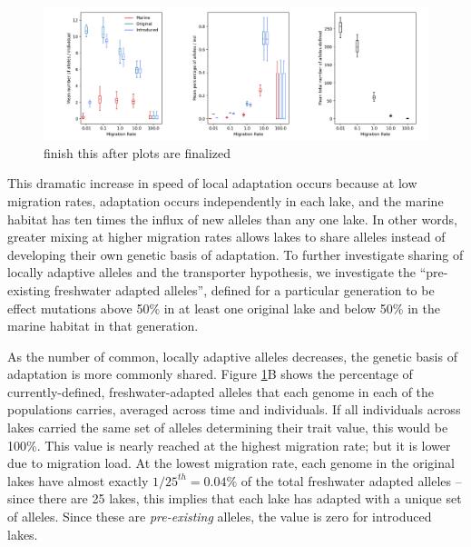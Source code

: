 \documentclass{article}
\begin{document}

\begin{figure}
	\begin{center}
  		\includegraphics[width=\linewidth]{semi_final_plots/FAA_semi_final.png}
  		\caption{
			finish this after plots are finalized
		}
		\label{fig:MPFAI}
	\end{center}
\end{figure}

This dramatic increase in speed of local adaptation occurs because
at low migration rates, adaptation occurs independently in each lake,
and the marine habitat has ten times the influx of new alleles than any one lake.
In other words, 
greater mixing at higher migration rates allows lakes to share alleles
instead of developing their own genetic basis of adaptation.
To further investigate sharing of locally adaptive alleles and the transporter hypothesis,
we investigate the ``pre-existing freshwater adapted alleles'', defined for a particular generation
to be effect mutations above 50\% in at least one original lake and below 50\% in the marine habitat in that generation.

As the number of common, locally adaptive alleles decreases,
the genetic basis of adaptation is more commonly shared.
Figure \ref{fig:MPFAI}B shows
the percentage of currently-defined, freshwater-adapted alleles 
that each genome in each of the populations carries,
averaged across time and individuals.
If all individuals across lakes carried the same set of alleles determining their trait value,
this would be 100\%.
This value is nearly reached at the highest migration rate;
but it is lower due to migration load.
At the lowest migration rate, 
each genome in the original lakes have almost exactly $1/25^{th} = 0.04\%$   
of the total freshwater adapted alleles --
since there are 25 lakes, this implies that each lake has adapted with a unique set of alleles.
Since these are \emph{pre-existing} alleles, the value is zero for introduced lakes.
\end{document}
